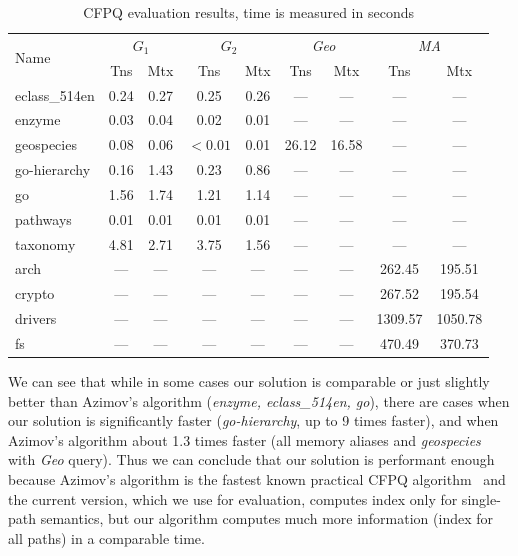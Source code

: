 {\setlength{\tabcolsep}{0.2em}
  \begin{table}
    \centering
    \caption{CFPQ evaluation results, time is measured in seconds}
    \label{tbl:CFPQ_index}
    \small
    \begin{tabular}{| l | c | c | c | c | c | c | c | c |}
      \hline

      \multirow{2}{*}{Name}  & \multicolumn{2}{c|}{$G_1$} & \multicolumn{2}{c|}{$G_2$} & \multicolumn{2}{c|}{\textit{Geo}} & \multicolumn{2}{c|}{\textit{MA}}\\
      \cline{2-9}
                      & Tns    & Mtx    & Tns  & Mtx  & Tns   & Mtx   & Tns     & Mtx \\
      \hline
      \hline
      eclass\_514en   & 0.24   & 0.27   & 0.25 & 0.26 & ---   & ---   & ---     & ---\\
      enzyme          & 0.03   & 0.04   & 0.02 & 0.01 & ---   & ---   & ---     & ---\\
      geospecies      & 0.08   & 0.06   & $<0.01$ & 0.01 & 26.12 & 16.58 & ---     & ---\\
      go-hierarchy    & 0.16   & 1.43   & 0.23 & 0.86 & ---   & ---   & ---     & ---\\
      go              & 1.56   & 1.74   & 1.21 & 1.14 & ---   & ---   & ---     & ---\\
      pathways        & 0.01   & 0.01   & 0.01 & 0.01 & ---   & ---   & ---     & ---\\
      taxonomy        & 4.81   & 2.71   & 3.75 & 1.56 & ---   & ---   & ---     & ---\\
      \hline
      arch            & ---    & ---    & ---  & ---  & ---   & ---   & 262.45  & 195.51  \\
      crypto          & ---    & ---    & ---  & ---  & ---   & ---   & 267.52  & 195.54  \\
      drivers         & ---    & ---    & ---  & ---  & ---   & ---   & 1309.57 & 1050.78 \\
      fs              & ---    & ---    & ---  & ---  & ---   & ---   & 470.49  & 370.73  \\
      \hline
    \end{tabular}
  \end{table}
}

We can see that while in some cases our solution is comparable or just slightly better than Azimov's algorithm (\textit{enzyme, eclass\_514en, go}), there are cases when our solution is significantly faster (\textit{go-hierarchy}, up to 9 times faster), and when Azimov's algorithm about 1.3 times faster (all memory aliases and \textit{geospecies} with \textit{Geo} query).
Thus we can conclude that our solution is performant enough because Azimov's algorithm is the fastest known practical CFPQ algorithm~\citep{10.1145/3398682.3399163} and the current version, which we use for evaluation, computes index only for single-path semantics, but our algorithm computes much more information (index for all paths) in a comparable time.


